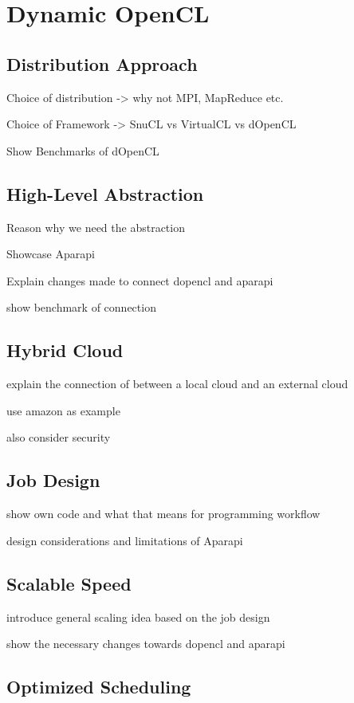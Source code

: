 
\chapter{Dynamic OpenCL}

\section{Distribution Approach}

Choice of distribution -> why not MPI, MapReduce etc.

Choice of Framework -> SnuCL vs VirtualCL vs dOpenCL

Show Benchmarks of dOpenCL

\section{High-Level Abstraction}

Reason why we need the abstraction

Showcase Aparapi

Explain changes made to connect dopencl and aparapi

show benchmark of connection

\section{Hybrid Cloud}

explain the connection of between a local cloud and an external cloud

use amazon as example

also consider security

\section{Job Design}

show own code and what that means for programming workflow

design considerations and limitations of Aparapi

\section{Scalable Speed}

introduce general scaling idea based on the job design

show the necessary changes towards dopencl and aparapi

\section{Optimized Scheduling}

